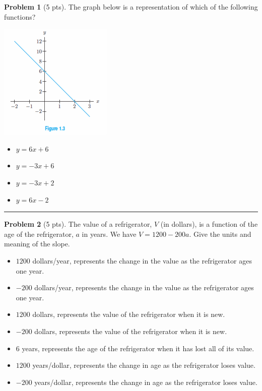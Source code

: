 \documentclass[12pt]{article}
\makeatletter
\theoremstyle{definition}
\newtheorem{problem}{Problem}
\newcommand*{\radiobutton}{%
  \@ifstar{\@radiobutton0}{\@radiobutton1}%
}
\newcommand*{\@radiobutton}[1]{%
  \begin{tikzpicture}
    \pgfmathsetlengthmacro\radius{height("X")/2}
    \draw[radius=\radius] circle;
    \ifcase#1 \fill[radius=.6*\radius] circle;\fi
  \end{tikzpicture}%
}
\makeatother
\begin{document}
\bigskip
\begin{problem}[5 pts]
The graph below is a representation of which of the following functions?
\begin{center}
\includegraphics{1graph2.png}
\end{center}
\begin{itemize}
\item[\radiobutton] $y=6x+6$
\item[\radiobutton] $y=-3x+6$
\item[\radiobutton] $y=-3x+2$
\item[\radiobutton] $y=6x-2$
\end{itemize}
\end{problem}
\hrule

\begin{problem}[5 pts]
The value of a refrigerator, $V$ (in dollars), is a function of the age of the refrigerator, $a$ in years. We have $V = 1200 - 200a$. Give the units and meaning of the slope.
\begin{itemize}
\item[\radiobutton] $1200$ dollars/year, represents the change in the value as the refrigerator ages one year.
\item[\radiobutton] $-200$ dollars/year, represents the change in the value as the refrigerator ages one year.
\item[\radiobutton] $1200$ dollars, represents the value of the refrigerator when it is new.
\item[\radiobutton] $-200$ dollars, represents the value of the refrigerator when it is new.
\item[\radiobutton] $6$ years, represents the age of the refrigerator when it has lost all of its value.
\item[\radiobutton] $1200$ years/dollar, represents the change in age as the refrigerator loses value.
\item[\radiobutton] $-200$ years/dollar, represents the change in age as the refrigerator loses value.
\end{itemize}
\end{problem}
\newpage
\end{document}
